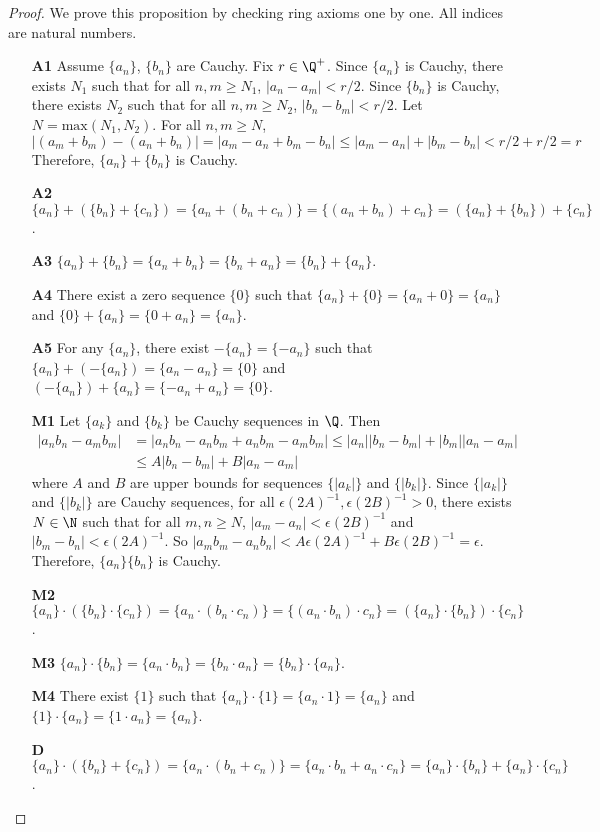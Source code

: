 \documentclass[10pt]{article}
\begin{document}
\begin{proof}
    We prove this proposition by checking ring axioms one by one. All indices are natural numbers. 
    \begin{enumerate}
        \item[\textbf{A1}] Assume $\{a_n\}$, $\{b_n\}$ are Cauchy. Fix $r\in\Q^+$. Since $\{a_n\}$ is Cauchy, there exists $N_1$ such that for all $n,m \geq N_1$, $|a_n-a_m| < r/2$. Since $\{b_n\}$ is Cauchy, there exists $N_2$ such that for all $n,m \geq N_2$, $|b_n-b_m| < r/2$. Let $N = \text{max}(N_1, N_2)$. For all $n,m \geq N$, 
        $$
            |(a_m+b_m)-(a_n+b_n)|=|a_m-a_n + b_m -b_n| \leq |a_m-a_n| + |b_m-b_n| < r/2 + r/2 = r
        $$
        Therefore, $\{a_n\}+\{b_n\}$ is Cauchy.
        \item[\textbf{A2}] $\{a_n\} + (\{b_n\} + \{c_n\}) = \{a_n + (b_n + c_n)\} = \{(a_n + b_n) + c_n\} = (\{a_n\} + \{b_n\}) + \{c_n\}$.
        \item[\textbf{A3}] $\{a_n\} + \{b_n\} = \{a_n + b_n\} = \{b_n + a_n\} = \{b_n\} + \{a_n\}$.
        \item[\textbf{A4}] There exist a zero sequence $\{0\}$ such that $\{a_n\} + \{0\} = \{a_n + 0\} = \{a_n\}$ and $\{0\} + \{a_n\}  = \{0 + a_n\} = \{a_n\}$.
        \item[\textbf{A5}] For any $\{a_n\}$, there exist $-\{a_n\} = \{-a_n\}$ such that $\{a_n\} + (-\{a_n\}) = \{a_n - a_n\} = \{0\}$ and $(-\{a_n\}) + \{a_n\} = \{- a_n + a_n\} = \{0\}$.
        \item[\textbf{M1}] Let $\{a_k\}$ and $\{b_k\}$ be Cauchy sequences in $\Q$. Then 
        \begin{align*}
            |a_nb_n - a_mb_m| &= |a_nb_n - a_nb_m + a_nb_m - a_mb_m| \leq |a_n||b_n - b_m| + |b_m||a_n - a_m|\\ 
            &\leq A|b_n - b_m| + B|a_n - a_m|
        \end{align*}
        where $A$ and $B$ are upper bounds for sequences $\{|a_k|\}$ and $\{|b_k|\}$. Since $\{|a_k|\}$ and $\{|b_k|\}$ are Cauchy sequences, for all $\epsilon({2A})^{-1}, \epsilon({2B})^{-1} > 0$, there exists $N \in \N$ such that for all $m, n \geq N$, $|a_m - a_n| < \epsilon({2B})^{-1}$ and $|b_m - b_n| < \epsilon({2A})^{-1}$. So $|a_mb_m - a_nb_n| < A \epsilon({2A})^{-1} + B \epsilon({2B})^{-1} = \epsilon$. Therefore, $\{a_n\}\{b_n\}$ is Cauchy.
        \item[\textbf{M2}] $\{a_n\} \cdot (\{b_n\} \cdot \{c_n\}) = \{a_n \cdot (b_n \cdot c_n)\} = \{(a_n \cdot b_n) \cdot c_n\} = (\{a_n\} \cdot \{b_n\}) \cdot \{c_n\}$.
        \item[\textbf{M3}] $\{a_n\} \cdot \{b_n\} = \{a_n \cdot b_n\} = \{b_n \cdot a_n\} = \{b_n\} \cdot \{a_n\}$.
        \item[\textbf{M4}] There exist $\{1\}$ such that $\{a_n\} \cdot \{1\} = \{a_n \cdot 1\} = \{a_n\}$ and $\{1\} \cdot \{a_n\}  = \{1 \cdot a_n\} = \{a_n\}$.
        \item[\textbf{D}] $\{a_n\} \cdot (\{b_n\} + \{c_n\}) = \{a_n \cdot (b_n + c_n)\} = \{a_n \cdot b_n + a_n \cdot c_n\} = \{a_n\} \cdot \{b_n\} + \{a_n\} \cdot \{c_n\}$.
    \end{enumerate}
\end{proof}
\end{document}

